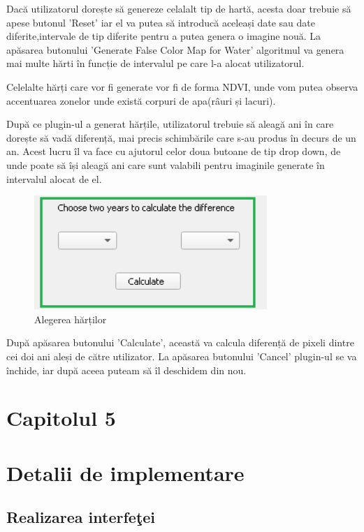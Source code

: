 \documentclass[12pt,a4paper]{article}
\theoremstyle{definition}
\theoremstyle{remark}
\begin{document}
Dacă utilizatorul dorește să genereze celalalt tip de hartă, acesta doar trebuie să apese butonul 'Reset' iar el va putea să introducă aceleași date sau date diferite,intervale de tip diferite pentru a  putea genera o imagine nouă.  La apăsarea butonului 'Generate False Color Map for Water' algoritmul va genera mai multe hărti în funcție de intervalul pe care l-a alocat utilizatorul.


Celelalte hărți care vor fi generate vor fi de forma NDVI, unde vom putea observa accentuarea zonelor unde există corpuri de apa(râuri și lacuri).

După ce plugin-ul a generat hărțile, utilizatorul trebuie să aleagă ani în care dorește să vadă diferență, mai precis schimbările care s-au produs în decurs de un an. Acest lucru îl va face cu ajutorul celor doua butoane de tip drop down, de unde poate să își aleagă ani care sunt valabili pentru imaginile generate în intervalul alocat de el.

\begin{figure}[H]
  \centering
  \includegraphics[width=250pt]{drop down.PNG}
  \caption{Alegerea hărților }   
\end{figure}

După apăsarea butonului 'Calculate', această va calcula diferență de pixeli dintre cei doi ani aleși de către utilizator.
La apăsarea butonului 'Cancel' plugin-ul se va închide, iar după aceea puteam să îl deschidem din nou. 
 
\newpage 
\section*{\bf Capitolul 5}
\markright{}
\section*{{\bf Detalii de implementare}}
\setcounter{section}{3}
\subsection{Realizarea interfe\c tei}
\end{document}
